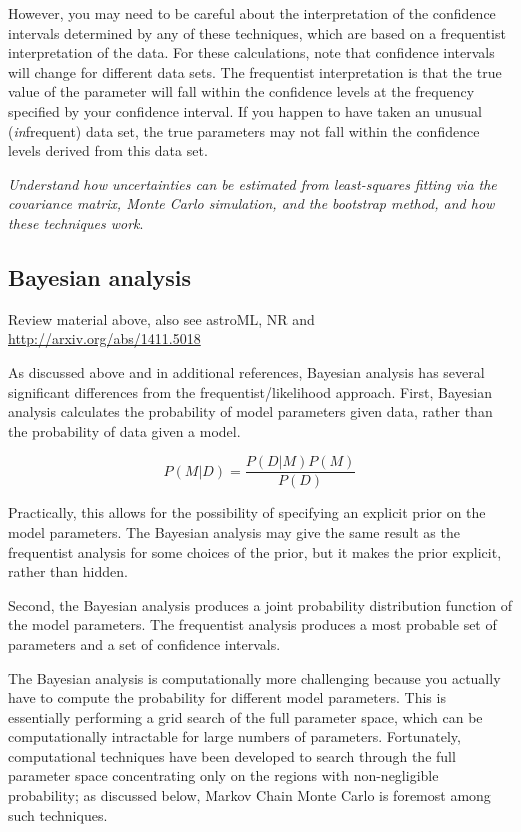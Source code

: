 \documentclass[12pt]{article}
\begin{document}
However, you may need to be careful about the interpretation of the
confidence intervals determined by any of these techniques, which are
based on a frequentist interpretation of the data. For these
calculations, note that confidence intervals will change for different
data sets. The frequentist interpretation is that the true value
of the parameter will fall within the confidence levels at the
frequency specified by your confidence interval. If you happen
to have taken an unusual (\emph{in}frequent) data set, the true
parameters may not fall within the confidence levels derived from
this data set.

\emph{Understand how uncertainties can be estimated from least-squares
fitting via the covariance matrix, Monte Carlo simulation, and the
bootstrap method, and how these techniques work}.

\subsection{Bayesian analysis}

Review material above, also see astroML, NR and
\url{http://arxiv.org/abs/1411.5018}

As discussed above and in additional references, Bayesian analysis has
several significant differences from the frequentist/likelihood
approach. First, Bayesian analysis calculates the probability of model
parameters given data, rather than the probability of data given a
model.

$$ P(M|D) = \frac{P(D|M)P(M)}{P(D)} $$

Practically, this allows for the possibility of specifying an explicit
prior on the model parameters. The Bayesian analysis may give the same
result as the frequentist analysis for some choices of the prior, but
it makes the prior explicit, rather than hidden.

Second, the Bayesian analysis produces a joint probability
distribution function of the model parameters. The frequentist
analysis produces a most probable set of parameters and a set of
confidence intervals.

The Bayesian analysis is computationally more challenging because you
actually have to compute the probability for different model
parameters. This is essentially performing a grid search of the full
parameter space, which can be computationally intractable for large
numbers of parameters. Fortunately, computational techniques have been
developed to search through the full parameter space concentrating
only on the regions with non-negligible probability; as discussed
below, Markov Chain Monte Carlo is foremost among such techniques.
\end{document}
